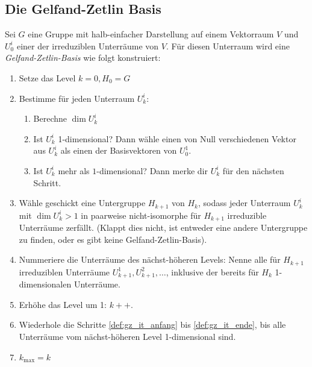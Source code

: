  \subsection{Die Gelfand-Zetlin Basis}
 \begin{definition}
 	\label{def:konstruktion_gz_basis}
	Sei $G$ eine Gruppe mit halb-einfacher Darstellung auf einem Vektorraum $V$ und $U^i_0$ einer der irreduziblen Unterräume von $V$. Für diesen Unterraum wird eine \emph{Gelfand-Zetlin-Basis} wie folgt konstruiert:
	\begin{enumerate}[label={\arabic*.)}]
		\item Setze das Level $k=0, H_0 = G$
		\item Bestimme für jeden Unterraum $U_k^i$: \label{def:gz_it_anfang}
		\begin{enumerate}
			\item Berechne $\dim{U_k^i}$
			\item Ist $U_k^i$ 1-dimensional? Dann wähle einen von Null verschiedenen Vektor aus $U_k^i$ als einen der Basisvektoren von $U^1_0$.
			\item Ist $U_k^i$ mehr als $1$-dimensional? Dann merke dir $U_k^i$ für den nächsten Schritt.
		\end{enumerate}
		\item Wähle geschickt eine Untergruppe $H_{k+1}$ von $H_k$, sodass jeder Unterraum $U_k^i$ mit $\dim{U_k^i}>1$ in paarweise nicht-isomorphe für $H_{k+1}$ irreduzible Unterräume  zerfällt. (Klappt dies nicht, ist entweder eine andere Untergruppe zu finden, oder es gibt keine Gelfand-Zetlin-Basis). \label{def:gz_it_ugschritt}
		\item Nummeriere die Unterräume des nächst-höheren Levels: Nenne alle für $H_{k+1}$ irreduziblen Unterräume $U_{k+1}^{1}, U_{k+1}^{2}, \ldots$, inklusive der bereits für $H_k$ 1-dimensionalen Unterräume.
		\item Erhöhe das Level um 1: $k++$. \label{def:gz_it_ende}
		\item Wiederhole die Schritte \ref{def:gz_it_anfang} bis \ref{def:gz_it_ende}, bis alle Unterräume vom nächst-höheren Level 1-dimensional sind.
		\item $k_{\text{max}} = k$
		\end{enumerate}
\end{definition}

